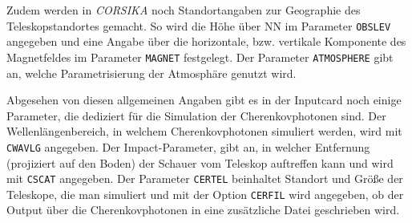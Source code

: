 Zudem werden in \textit{CORSIKA} noch Standortangaben zur Geographie des Teleskopstandortes gemacht.
So wird die Höhe über NN im Parameter \texttt{OBSLEV} angegeben und eine Angabe über die horizontale, bzw. vertikale Komponente des Magnetfeldes im Parameter \texttt{MAGNET} festgelegt.
Der Parameter \texttt{ATMOSPHERE} gibt an, welche Parametrisierung der Atmosphäre genutzt wird.\cite{CORSIKA-Handbook}

Abgesehen von diesen allgemeinen Angaben gibt es in der Inputcard noch einige Parameter, die dediziert für die Simulation der Cherenkovphotonen sind.
Der Wellenlängenbereich, in welchem Cherenkovphotonen simuliert werden, wird mit \texttt{CWAVLG} angegeben.
Der Impact-Parameter, gibt an, in welcher Entfernung (projiziert auf den Boden) der Schauer vom Teleskop auftreffen kann und wird mit \texttt{CSCAT} angegeben.
Der Parameter \texttt{CERTEL} beinhaltet Standort und Größe der Teleskope, die man simuliert und mit der Option \texttt{CERFIL} wird angegeben, ob der Output über die Cherenkovphotonen in eine zusätzliche Datei geschrieben wird.


